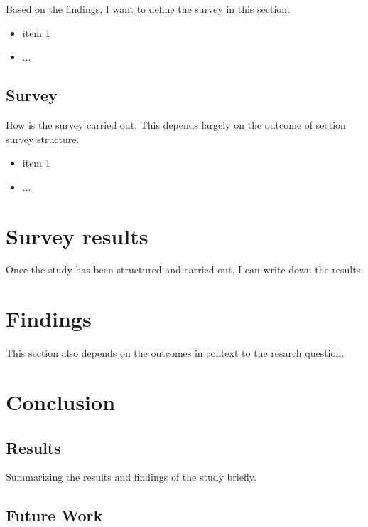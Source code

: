             Based on the findings, I want to define the survey in this section.

            \begin{itemize}
                \item item 1
                \item ...
            \end{itemize}

        \section{Survey}

            How is the survey carried out. This depends largely on the outcome of section survey structure.

            \begin{itemize}
                \item item 1
                \item ...
            \end{itemize}

    \chapter{Survey results}

        Once the study has been structured and carried out, I can write down the results.

    \chapter{Findings}

        This section also depends on the outcomes in context to the resarch question.

    \chapter{Conclusion}

        \section{Results}

            Summarizing the results and findings of the study briefly.

        \section{Future Work}

